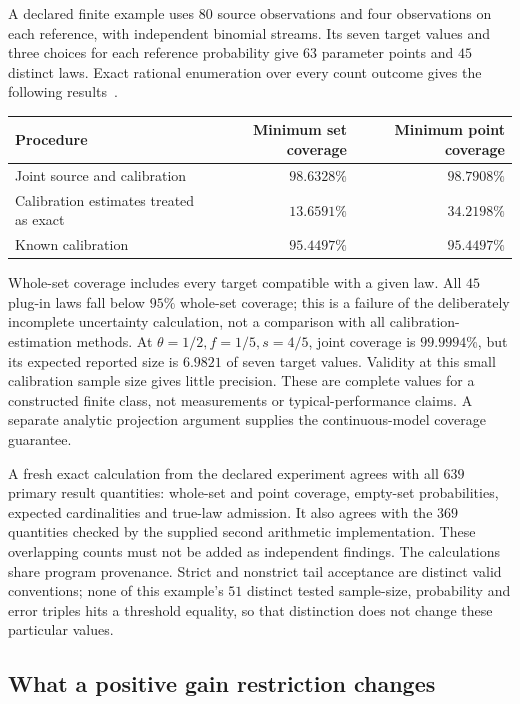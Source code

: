 A declared finite example uses $80$ source observations and four observations on each reference, with independent binomial streams. Its seven target values and three choices for each reference probability give $63$ parameter points and $45$ distinct laws. Exact rational enumeration over every count outcome gives the following results~\cite{justusJoint}.
\begin{center}
\small
\begin{tabular}{@{}p{}rr@{}}
\toprule
Procedure & Minimum set coverage & Minimum point coverage\\
\midrule
Joint source and calibration & $98.6328\%$ & $98.7908\%$\\
Calibration estimates treated as exact & $13.6591\%$ & $34.2198\%$\\
Known calibration & $95.4497\%$ & $95.4497\%$\\
\bottomrule
\end{tabular}
\end{center}
Whole-set coverage includes every target compatible with a given law. All $45$ plug-in laws fall below $95\%$ whole-set coverage; this is a failure of the deliberately incomplete uncertainty calculation, not a comparison with all calibration-estimation methods. At $\theta=1/2,f=1/5,s=4/5$, joint coverage is $99.9994\%$, but its expected reported size is $6.9821$ of seven target values. Validity at this small calibration sample size gives little precision. These are complete values for a constructed finite class, not measurements or typical-performance claims. A separate analytic projection argument supplies the continuous-model coverage guarantee.

A fresh exact calculation from the declared experiment agrees with all $639$ primary result quantities: whole-set and point coverage, empty-set probabilities, expected cardinalities and true-law admission. It also agrees with the $369$ quantities checked by the supplied second arithmetic implementation. These overlapping counts must not be added as independent findings. The calculations share program provenance. Strict and nonstrict tail acceptance are distinct valid conventions; none of this example's $51$ distinct tested sample-size, probability and error triples hits a threshold equality, so that distinction does not change these particular values.

\subsection{What a positive gain restriction changes}

